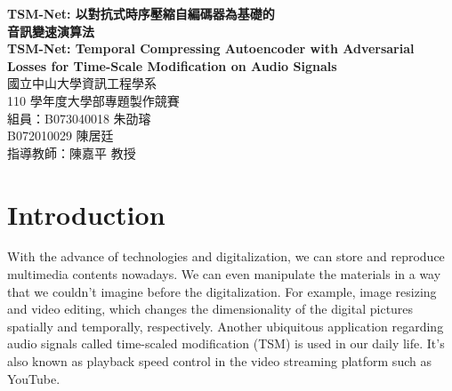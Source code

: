 \documentclass[12pt]{article}
\begin{document}
\begin{titlepage}
\begin{center}
\vspace*{2cm}
{\bf \LARGE TSM-Net: 以對抗式時序壓縮自編碼器為基礎的\\音訊變速演算法} \\
\vspace*{0.3cm}
{\bf \LARGE TSM-Net: Temporal Compressing Autoencoder with Adversarial Losses for Time-Scale Modification on Audio Signals} \\[2cm]
{\large 國立中山大學資訊工程學系} \\
{\large 110 學年度大學部專題製作競賽} \\[2cm]
{\large 組員：B073040018 朱劭璿} \\
{\large \hspace{1.55cm}B072010029 陳居廷} \\[2cm]
{\large 指導教師：陳嘉平 教授}
\end{center}
\end{titlepage}
\newpage
\begin{abstract}
We proposed a novel approach in the field of time-scale modification on the audio signals. While traditional methods use framing technique and spectral approaches use short-time Fourier transform to get high-level units, TSM-Net, our neural-network model encodes the raw audio into a high-level latent representation called neuralgram. Since the resulting neuralgram is a two-dimensional image with real values, we apply some existing image resizing techniques on the neuralgram and decode it using our neural decoder to obtain the time-scaled audio. Our method yields little artifacts and opens a new possibility in the research of modern time-scale modification.
\end{abstract}
\newpage
\tableofcontents
\newpage

\section{Introduction}
With the advance of technologies and digitalization, we can store and reproduce multimedia contents nowadays. We can even manipulate the materials in a way that we couldn't imagine before the digitalization. For example, image resizing and video editing, which changes the dimensionality of the digital pictures spatially and temporally, respectively. Another ubiquitous application regarding audio signals called time-scaled modification (TSM) is used in our daily life. It's also known as playback speed control in the video streaming platform such as YouTube.
\end{document}
